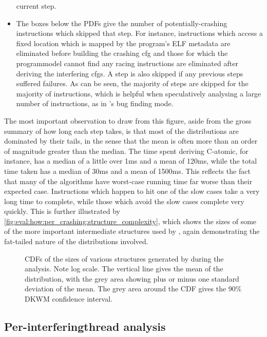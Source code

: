 \begin{itemize}
  current step.
\item The boxes below the PDFs give the number of potentially-crashing
  instructions which skipped that step.  For instance, instructions
  which access a fixed location which is mapped by the program's ELF
  metadata are eliminated before building the crashing \gls{cfg} and
  those for which the \gls{programmodel} cannot find any racing
  instructions are eliminated after deriving the interfering
  \glspl{cfg}.  A step is also skipped if any previous steps suffered
  failures.  As can be seen, the majority of steps are skipped for the
  majority of instructions, which is helpful when speculatively
  analysing a large number of instructions, as in {\technique}'s bug
  finding mode.
\end{itemize}
The most important observation to draw from this figure, aside from
the gross summary of how long each step takes, is that most of the
distributions are dominated by their tails, in the sense that the mean
is often more than an order of magnitude greater than the median.  The
time spent deriving C-atomic, for instance, has a median of a little
over 1ms and a mean of 120ms, while the total time taken has a median
of 30ms and a mean of 1500ms.  This reflects the fact that many of the
algorithms have worst-case running time far worse than their expected
case.  Instructions which happen to hit one of the slow cases take a
very long time to complete, while those which avoid the slow cases
complete very quickly.  This is further illustrated by
\autoref{fig:eval:how:per_crashing:structure_complexity}, which shows
the sizes of some of the more important intermediate structures used
by {\technique}, again demonstrating the fat-tailed nature of the
distributions involved.

\begin{figure}
  \centerline{
  }
  \caption{CDFs of the sizes of various structures generated by
    {\technique} during the analysis.  Note log scale.  The vertical
    line gives the mean of the distribution, with the grey area
    showing plus or minus one standard deviation of the mean.  The
    grey area around the CDF gives the 90\% DKWM confidence
    interval. \label{fig:eval:how:per_crashing:structure_complexity}}
\end{figure}

\subsection{Per-\gls{interferingthread} analysis}

